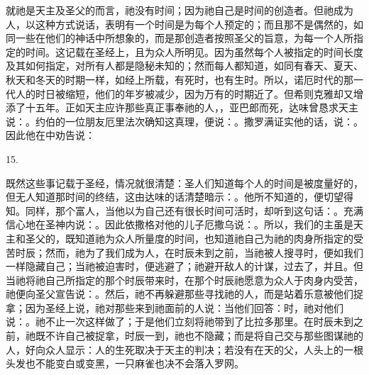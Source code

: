 就祂是天主及圣父的而言，祂没有时间；因为祂自己是时间的创造者。但祂成为人，以这种方式说话，表明有一个时间是为每个人预定的；而且那不是偶然的，如同一些在他们的神话中所想象的，而是那创造者按照圣父的旨意，为每一个人所指定的时间。这记载在圣经上，且为众人所明见。因为虽然每个人被指定的时间长度及其如何指定，对所有人都是隐秘未知的；然而每人都知道，如同有春天、夏天、秋天和冬天的时期一样，如经上所载，有死时，也有生时。所以，诺厄时代的那一代人的时日被缩短，他们的年岁被减少，因为万有的时期近了。但希则克雅却又增添了十五年。正如天主应许那些真正事奉祂的人，，亚巴郎而死，达味曾恳求天主说：。约伯的一位朋友厄里法次确知这真理，便说：。撒罗满证实他的话，说：。因此他在中劝告说：\par

15. \par

既然这些事记载于圣经，情况就很清楚：圣人们知道每个人的时间是被度量好的，但无人知道那时间的终结，这由达味的话清楚暗示：。他所不知道的，便切望得知。同样，那个富人，当他以为自己还有很长时间可活时，却听到这句话：。充满信心地在圣神内说：。因此依撒格对他的儿子厄撒乌说：。所以，我们的主虽是天主和圣父的，既知道祂为众人所量度的时间，也知道祂自己为祂的肉身所指定的受苦时辰；然而，祂为了我们成为人，在时辰未到之前，当祂被人搜寻时，便如我们一样隐藏自己；当祂被迫害时，便逃避了；祂避开敌人的计谋，过去了，并且。但当祂将祂自己所指定的那个时辰带来时，在那个时辰祂愿意为众人于肉身内受苦，祂便向圣父宣告说：。然后，祂不再躲避那些寻找祂的人，而是站着乐意被他们捉拿；因为圣经上说，祂对那些来到祂面前的人说：当他们回答：时，祂对他们说：。祂不止一次这样做了；于是他们立刻将祂带到了比拉多那里。在时辰未到之前，祂既不许自己被捉拿，时辰一到，祂也不隐藏；而是将自己交与那些图谋祂的人，好向众人显示：人的生死取决于天主的判决；若没有在天的父，人头上的一根头发也不能变白或变黑，一只麻雀也决不会落入罗网。\par

